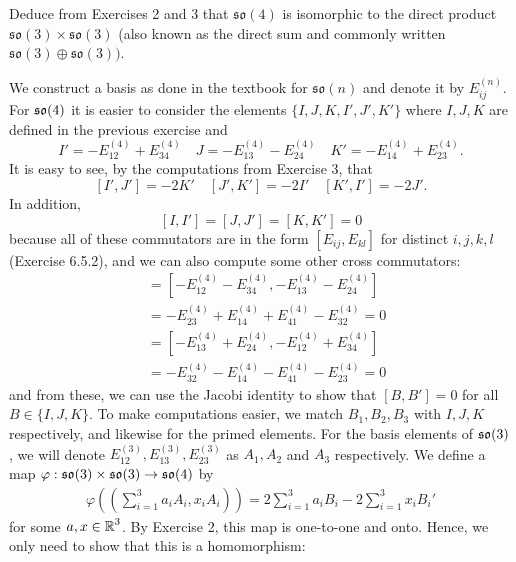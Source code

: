 \documentclass[12pt,onecolumn]{article}
\newcommand{\four}{^{(4)}}
\newcommand{\three}{^{(3)}}
\begin{document}
\begin{exercise}[6.5.6]
 Deduce from Exercises 2 and 3 that $\mathfrak{so}(4)$ is isomorphic to the direct product $\mathfrak{so}(3) \times \mathfrak{so}(3)$ (also known as the direct sum and commonly written $\mathfrak{so}(3) \oplus \mathfrak{so}(3))$.
\end{exercise}
\begin{answer}
We construct a basis as done in the textbook for $\mathfrak{so}(n)$ and denote it by $E_{ij}^{(n)}$. For $\operatorname{\mathfrak{so}}(4)$ it is easier to consider the elements $\{I,J,K,I',J',K'\}$ where $I,J,K$ are defined in the previous exercise and \[
I'=-E_{12}\four + E_{34}\four \quad J=-E_{13}\four-E_{24}\four \quad K' = -E_{14}\four +E_{23}\four.
\] It is easy to see, by the computations from Exercise 3, that 
\[
[I',J']=-2K' \quad [J',K']=-2I' \quad [K',I']=-2J'.
\]
In addition, 
\[
[I,I'] = [J,J'] = [K,K'] = 0
\]
because all of these commutators are in the form $[E_{ij},E_{kl}]$ for distinct $i,j,k,l$ (Exercise 6.5.2), and we can also compute some other cross commutators:
\begin{align*}
    [I,K'] &= [-E_{12}\four - E_{34}\four, -E_{13}\four-E_{24}\four] \\
    &= -E_{23}\four +E_{14}\four +E_{41}\four-E_{32}\four = 0
\end{align*}
\begin{align*}
    [J,I'] &= [-E_{13}\four + E_{24}\four,-E_{12}\four + E_{34}\four ] \\
    &= -E_{32}\four -E_{14}\four -E_{41}\four -E_{23}\four = 0
\end{align*}
and from these, we can use the Jacobi identity to show that $[B,B'] = 0$ for all $B\in\{I,J,K\}$. To make computations easier, we match $B_1,B_2,B_3$ with $I,J,K$ respectively, and likewise for the primed elements. For the basis elements of $\operatorname{\mathfrak{so}}(3)$, we will denote $E_{12}\three,E_{13}\three, E_{23}\three$ as $A_1,A_2$ and $A_3$ respectively. 
We define a map $\varphi : \operatorname{\mathfrak{so}}(3) \times \operatorname{\mathfrak{so}}(3) \rightarrow \operatorname{\mathfrak{so}}(4)$ by
\begin{align*}
    \varphi((\sum_{i=1}^3 a_iA_i,x_iA_i)) = 2\sum_{i=1}^3 a_iB_i -  2\sum_{i=1}^3 x_iB_i' 
\end{align*}
for some $a,x \in \operatorname{\mathbb{R}}^3$.
By Exercise 2, this map is one-to-one and onto. Hence, we only need to show that this is a homomorphism:

\end{answer}
\end{document}
